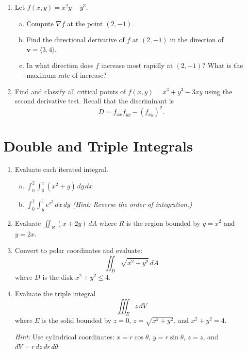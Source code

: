 \documentclass[11pt]{article}
\begin{document}
\begin{enumerate}[resume]
\item Let $f(x,y) = x^2 y - y^3$.
\begin{enumerate}[(a)]
  \item Compute $\nabla f$ at the point $(2, -1)$.
  \item Find the directional derivative of $f$ at $(2, -1)$ in the direction of $\bm{v} = \langle 3, 4 \rangle$.
  \item In what direction does $f$ increase most rapidly at $(2, -1)$? What is the maximum rate of increase?
\end{enumerate}

\item Find and classify all critical points of $f(x,y) = x^3 + y^3 - 3xy$ using the second derivative test. Recall that the discriminant is
\[
  D = f_{xx} f_{yy} - (f_{xy})^2.
\]
\end{enumerate}

\section*{Double and Triple Integrals}

\begin{enumerate}[resume]
\item Evaluate each iterated integral.
\begin{enumerate}[(a)]
  \item $\displaystyle \int_0^2 \int_0^{x} (x^2 + y) \, dy \, dx$

  \item $\displaystyle \int_0^1 \int_{y}^{1} e^{x^2} \, dx \, dy$ \quad \emph{(Hint: Reverse the order of integration.)}
\end{enumerate}

\item Evaluate $\displaystyle \iint_R (x + 2y) \, dA$ where $R$ is the region bounded by $y = x^2$ and $y = 2x$.

\item Convert to polar coordinates and evaluate:
\[
  \iint_D \sqrt{x^2 + y^2} \, dA
\]
where $D$ is the disk $x^2 + y^2 \leq 4$.

\item Evaluate the triple integral
\[
  \iiint_E z \, dV
\]
where $E$ is the solid bounded by $z = 0$, $z = \sqrt{x^2 + y^2}$, and $x^2 + y^2 = 4$.

\emph{Hint:} Use cylindrical coordinates: $x = r\cos\theta$, $y = r\sin\theta$, $z = z$, and $dV = r \, dz \, dr \, d\theta$.
\end{enumerate}
\end{document}
